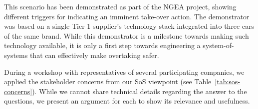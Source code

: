 This scenario has been demonstrated as part of the NGEA project, showing different triggers for indicating an imminent take-over action.
The demonstrator was based on a single Tier-1 supplier's technology stack integrated into three cars of the same brand.
While this demonstrator is a milestone towards making such technology available, it is only a first step towards engineering a system-of-systems that can effectively make overtaking safer.

During a workshop with representatives of several participating companies, we applied the stakeholder concerns from our SoS viewpoint (see Table~\ref{tab:sos-concerns}). 
While we cannot share technical details regarding the answer to the questions, we present an argument for each to show its relevance and usefulness.

